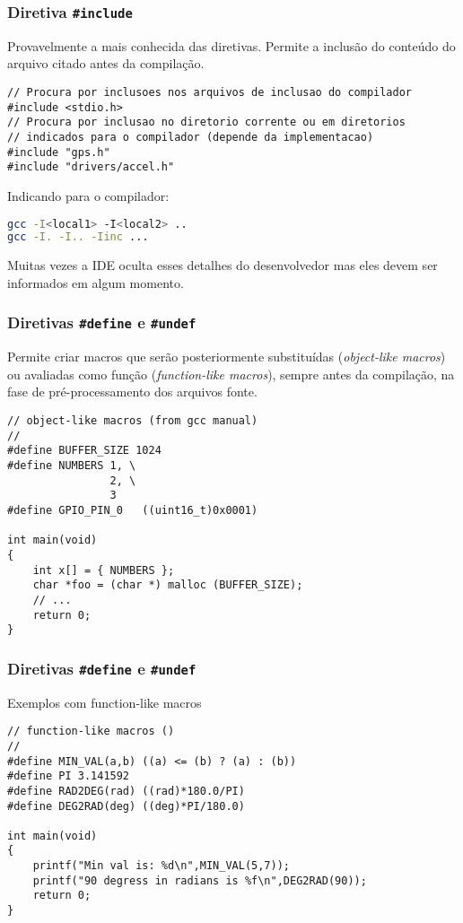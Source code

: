 \documentclass{beamer}
\begin{document}
\begin{frame}[fragile]
	\frametitle{Diretiva \texttt{\#include}}
	Provavelmente a mais conhecida das diretivas. Permite a inclusão do conteúdo do arquivo citado antes da compilação.
		
	\begin{lstlisting}[style=customc]
// Procura por inclusoes nos arquivos de inclusao do compilador
#include <stdio.h>
// Procura por inclusao no diretorio corrente ou em diretorios 
// indicados para o compilador (depende da implementacao)
#include "gps.h"
#include "drivers/accel.h"
	\end{lstlisting}

	Indicando para o compilador:
	
	\begin{lstlisting}[style=customc,language=bash]
gcc -I<local1> -I<local2> ..
gcc -I. -I.. -Iinc ...
	\end{lstlisting}

	Muitas vezes a IDE oculta esses detalhes do desenvolvedor mas eles devem ser informados em algum momento.
	
\end{frame}

\begin{frame}[fragile]
	\frametitle{Diretivas \texttt{\#define} e \texttt{\#undef}}
	Permite criar macros que serão posteriormente substituídas (\textit{object-like macros}) ou avaliadas como função (\textit{function-like macros}), sempre antes da compilação, na fase de pré-processamento dos arquivos fonte.
	
	\begin{lstlisting}[style=customc]
// object-like macros (from gcc manual)
//
#define BUFFER_SIZE 1024
#define NUMBERS 1, \
                2, \
                3
#define GPIO_PIN_0   ((uint16_t)0x0001)

int main(void)
{
    int x[] = { NUMBERS };
    char *foo = (char *) malloc (BUFFER_SIZE);
    // ...
    return 0;
}
	\end{lstlisting}
\end{frame}

\begin{frame}[fragile]
	\frametitle{Diretivas \texttt{\#define} e \texttt{\#undef}}
	Exemplos com function-like macros
	\begin{lstlisting}[style=customc]
// function-like macros ()
//
#define MIN_VAL(a,b) ((a) <= (b) ? (a) : (b))
#define PI 3.141592
#define RAD2DEG(rad) ((rad)*180.0/PI)
#define DEG2RAD(deg) ((deg)*PI/180.0)

int main(void)
{
	printf("Min val is: %d\n",MIN_VAL(5,7));	
	printf("90 degress in radians is %f\n",DEG2RAD(90));
	return 0;
}
	\end{lstlisting}
\end{frame}
\end{document}
